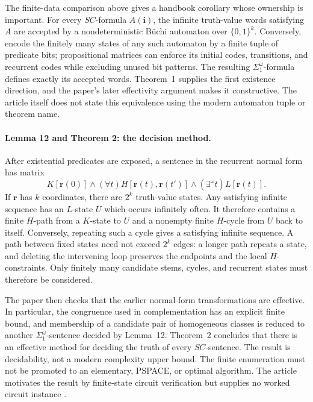 The finite-data comparison above gives a handbook corollary whose ownership is
important.  For every \(SC\)-formula \(A(\mathbf i)\), the infinite truth-value
words satisfying \(A\) are accepted by a nondeterministic B\"uchi automaton
over \(\{0,1\}^k\).  Conversely, encode the finitely many states of any such
automaton by a finite tuple of predicate bits; propositional matrices can
enforce its initial codes, transitions, and recurrent codes while excluding
unused bit patterns.  The resulting \(\Sigma_1^\omega\)-formula defines exactly
its accepted words.  Theorem~1 supplies the first existence direction, and the
paper's later effectivity argument makes it constructive.  The article itself
does not state this equivalence using the modern automaton tuple or theorem
name.

\paragraph{Lemma 12 and Theorem 2: the decision method.}
After existential predicates are exposed, a sentence in the recurrent normal
form has matrix
\[
 K[\mathbf r(0)]
 \land
 (\forall t)H[\mathbf r(t),\mathbf r(t')]
 \land
 (\exists^\omega t)L[\mathbf r(t)].
\]
If \(\mathbf r\) has \(k\) coordinates, there are \(2^k\) truth-value states.
Any satisfying infinite sequence has an \(L\)-state \(U\) which occurs
infinitely often.  It therefore contains a finite \(H\)-path from a
\(K\)-state to \(U\) and a nonempty finite \(H\)-cycle from \(U\) back to
itself.  Conversely, repeating such a cycle gives a satisfying infinite
sequence.  A path between fixed states need not exceed \(2^k\) edges: a longer
path repeats a state, and deleting the intervening loop preserves the endpoints
and the local \(H\)-constraints.  Only finitely many candidate stems, cycles,
and recurrent states must therefore be considered.

The paper then checks that the earlier normal-form transformations are
effective.  In particular, the congruence used in complementation has an
explicit finite bound, and membership of a candidate pair of homogeneous
classes is reduced to another \(\Sigma_1^\omega\)-sentence decided by
Lemma~12.  Theorem~2 concludes that there is an effective method for deciding
the truth of every \(SC\)-sentence.
The result is decidability, not a modern complexity upper bound.  The finite
enumeration must not be promoted to an elementary, PSPACE, or optimal
algorithm.  The article motivates the result by finite-state circuit
verification but supplies no worked circuit instance \cite[pp.~7--9]{Buchi1962}.


